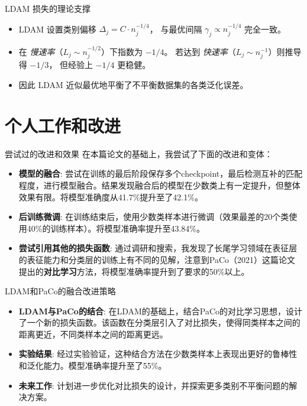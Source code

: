 \documentclass{beamer}
\begin{document}
\begin{frame}{LDAM 损失的理论支撑}
    \begin{itemize}
        \item LDAM 设置类别偏移  
              $\displaystyle \Delta_j=C\cdot n_j^{-1/4}$，
              与最优间隔 $\gamma_j\!\propto\! n_j^{-1/4}$ 完全一致。
        \item 在 \emph{慢速率}（$L_j\sim n_j^{-1/2}$）下指数为 $-1/4$。  
              若达到 \emph{快速率}（$L_j\sim n_j^{-1}$）则推导得 $-1/3$，  
              但经验上 $-1/4$ 更稳健。
        \item 因此 LDAM 近似最优地平衡了不平衡数据集的各类泛化误差。
    \end{itemize}
\end{frame}

\section{个人工作和改进}

\begin{frame}{尝试过的改进和效果}
    在本篇论文的基础上，我尝试了下面的改进和变体：
    \begin{itemize}
        \item \textbf{模型的融合}: 尝试在训练的最后阶段保存多个checkpoint，最后检测互补的匹配程度，进行模型融合。结果发现融合后的模型在少数类上有一定提升，但整体效果有限。将模型准确度从41.7\%提升至了42.1\%。
        \item \textbf{后训练微调}: 在训练结束后，使用少数类样本进行微调（效果最差的20个类使用40\%的训练样本）。将模型准确率提升至43.84\%。
        \item \textbf{尝试引用其他的损失函数}: 通过调研和搜索，我发现了长尾学习领域在表征层的表征能力和分类层的训练上有不同的见解，注意到PaCo（2021）这篇论文提出的\textbf{对比学习}方法，将模型准确率提升到了要求的50\%以上。
    \end{itemize}
\end{frame}

\begin{frame}{LDAM和PaCo的融合改进策略}
    \begin{itemize}
        \item \textbf{LDAM与PaCo的结合}: 在LDAM的基础上，结合PaCo的对比学习思想，设计了一个新的损失函数。该函数在分类层引入了对比损失，使得同类样本之间的距离更近，不同类样本之间的距离更远。
        \item \textbf{实验结果}: 经过实验验证，这种结合方法在少数类样本上表现出更好的鲁棒性和泛化能力。模型准确率提升至了55\%。
        \item \textbf{未来工作}: 计划进一步优化对比损失的设计，并探索更多类别不平衡问题的解决方案。
    \end{itemize}
\end{frame}
\end{document}
